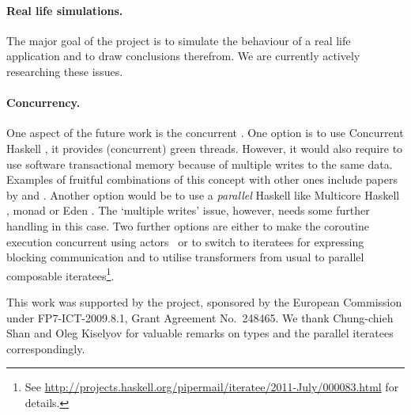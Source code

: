 \paragraph{Real life simulations.}
The major goal of the project is to simulate the behaviour of a real life application and to draw conclusions therefrom.
We are currently actively researching these issues.

\paragraph{Concurrency.}
One aspect of the future work is the concurrent \soosim.
One option is to use Concurrent Haskell \cite{ConcHs}, it provides (concurrent) green threads.
However, it would also require to use software transactional memory \cite{springerlink:10.1007/s004460050028} because of multiple writes to the same data.
Examples of fruitful combinations of this concept with other ones include papers by \citeauthor{Harris:2008:CMT:1378704.1378725} \cite{Harris:2008:CMT:1378704.1378725} and \citeauthor{Bieniusa:2010:BAA:1835698.1835714} \cite{Bieniusa:2010:BAA:1835698.1835714,springerlink:10.1007/978-3-642-25959-3_2}.
Another option would be to use a \emph{parallel} Haskell like Multicore Haskell \cite{marlow:rsm},  monad \cite{par-monad} or Eden \cite{eden}.
The `multiple writes' issue, however, needs some further handling in this case.
Two further options are either to make the coroutine execution concurrent using actors~\cite{Hewitt:1973:UMA:1624775.1624804,sulzmann2008actors} or to switch to iteratees for expressing blocking communication and to utilise transformers from usual to parallel composable iteratees\footnote{See \url{http://projects.haskell.org/pipermail/iteratee/2011-July/000083.html} for details.}.

%

\acks

This work was supported by the \soos project, sponsored by the European Commission under FP7-ICT-2009.8.1, Grant Agreement No.~248465.
We thank Chung-chieh Shan and Oleg Kiselyov for valuable remarks on
 types and the parallel iteratees correspondingly.

